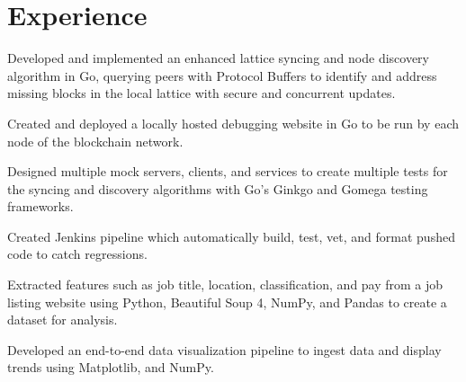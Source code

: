 \section{Experience}

\begin{resumeItem}
\begin{resumeList}
    \item Developed and implemented an enhanced lattice syncing and node discovery algorithm in Go, querying peers with Protocol Buffers to identify and address missing blocks in the local lattice with secure and concurrent updates.
    \item Created and deployed a locally hosted debugging website in Go to be run by each node of the blockchain network.
    \item Designed multiple mock servers, clients, and services to create multiple tests for the syncing and discovery algorithms with Go's Ginkgo and Gomega testing frameworks.
    \item Created Jenkins pipeline which automatically build, test, vet, and format pushed code to catch regressions.
\end{resumeList}
\end{resumeItem}

\begin{resumeItem}
\begin{resumeList}
    \item Extracted features such as job title, location, classification, and pay from a job listing website using Python, Beautiful Soup 4, NumPy, and Pandas to create a dataset for analysis. 
    \item Developed an end-to-end data visualization pipeline to ingest data and display trends using Matplotlib, and NumPy.
\end{resumeList}
\end{resumeItem}



